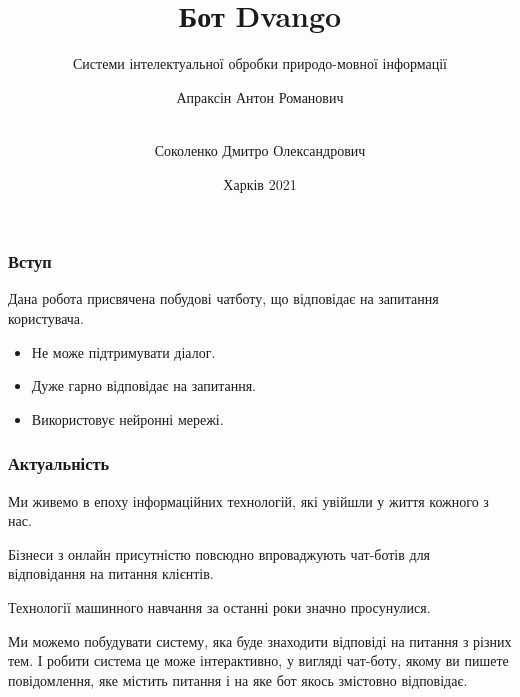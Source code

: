 \documentclass{beamer}
\title{Бот Dvango}
\subtitle{Системи інтелектуальної обробки природо-мовної інформації}
\author[Апраксін, Соколенко]{
    Апраксін Антон Романович
    \and\\
    Соколенко Дмитро Олександрович
}
\institute[ХНУРЕ]{ІТШІ-18-1}
\date{Харків 2021}
\begin{document}
\frame{\titlepage}

\begin{frame}
    \frametitle{Вступ}
    Дана робота присвячена побудові чатботу, що відповідає на запитання користувача.

    \begin{itemize}
        \item Не може підтримувати діалог.
        \item Дуже гарно відповідає на запитання.
        \item Використовує нейронні мережі.
    \end{itemize}
    
\end{frame}

\begin{frame}
    \frametitle{Актуальність}
    Ми живемо в епоху інформаційних технологій, які увійшли у життя кожного з нас. 

    Бізнеси з онлайн присутністю повсюдно впроваджують чат-ботів для відповідання на питання клієнтів.

    Технології машинного навчання за останні роки значно просунулися.


    Ми можемо побудувати систему, яка буде знаходити відповіді на питання з різних тем. І робити система це може інтерактивно, у вигляді чат-боту, якому ви пишете повідомлення, яке містить питання і на яке бот якось змістовно відповідає.

\end{frame}
\end{document}

